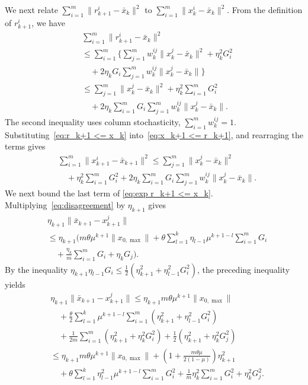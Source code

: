 \documentclass[twocolumn]{autart}    %
\newcommand{\1}{\mathbf{1}}
\begin{document}
We next relate $\sum_{i=1}^m \|r_{k+1}^i - \bar{x}_k\|^2$ to $\sum_{i=1}^m \|x_k^i - \bar{x}_k\|^2$. 
From the definition of $r_{k+1}^i$, we have
\begin{align}\label{eq:r_k+1 <= x_k}
&\sum_{i=1}^m\|r_{k+1}^i - \bar{x}_k\|^2\nonumber \\ 
&\leq \sum_{i=1}^m\Big\{ \sum_{j=1}^m w_k^{ij} \|x_k^j - \bar{x}_k\|^2 + \eta_k^2 G_i^2  \nonumber \\ 
&\hspace{1em}+ 2\eta_k G_i \sum_{j=1}^m w_k^{ij} \|x_k^j - \bar{x}_k\|  \Big\} \nonumber \\ 
&\leq  \sum_{j=1}^m \|x_k^j - \bar{x}_k\|^2  + \eta_k^2 \sum_{i=1}^m G_i^2   \nonumber \\  
&\hspace{1em}+ 2\eta_k \sum_{i=1}^m G_i \sum_{j=1}^m w_k^{ij}  \|x_k^j - \bar{x}_k\|.
\end{align}
The second inequality uses column stochasticity, $\sum_{i=1}^m w_k^{ij}=1$. Substituting~\eqref{eq:r_k+1 <= x_k} into~\eqref{eq:x_k+1 <= r_k+1}, and rearraging the terms gives
\begin{align}\label{eq:exp r_k+1 <= x_k}
&\sum_{i=1}^m \|x_{k+1}^i - \bar{x}_{k+1}\|^2       \leq   \sum_{j=1}^m \|x_k^j - \bar{x}_k\|^2\nonumber\\
&\hspace{1em}+ \eta_k^2 \sum_{i=1}^m  G_i^2  + 2\eta_k \sum_{i=1}^m  G_i \sum_{j=1}^m  w_k^{ij}   \|x_k^j - \bar{x}_k\|.  
\end{align}
We next bound the last term of \eqref{eq:exp r_k+1 <= x_k}.
Multiplying~\eqref{eq:disagreement} by $\eta_{k+1}$ gives
\begin{align*}
& \eta_{k+1}\|\bar{x}_{k+1}-x_{k+1}^j\| \nonumber \\
&\le  \eta_{k+1}\bigg(m\theta\mu^{k+1} \|x_{0,\max}\| + \theta \sum_{l=1}^k \eta_{l-1} \mu^{k+1-l} \sum_{i=1}^m G_i \nonumber \\
& \hspace{1em} + \frac{\eta_k}{m} \sum_{i=1}^m G_i + \eta_k G_j  \bigg).
\end{align*}
By the inequality $\eta_{k+1} \eta_{l-1} G_i \leq \frac{1}{2} \left( \eta_{k+1}^2 + \eta_{l-1}^2 G_i^2 \right)$, the preceding inequality yields 
\begin{align}\label{eq:eta*disagreement}
& \eta_{k+1} \|\bar{x}_{k+1}-x_{k+1}^j\|  \leq  \eta_{k+1} m\theta\mu^{k+1} \|x_{0,\max}\|  \nonumber \\ 
& \quad + \frac{\theta }{2} \sum_{l=1}^k \mu^{k+1-l} \sum_{i=1}^m \left( \eta_{k+1}^2 + \eta_{l-1}^2 G_i^2 \right)\nonumber \\
& \quad+ \frac{1}{2m} \sum_{i=1}^m \left(  \eta_{k+1}^2 + \eta_{k}^2  G_i^2 \right) + \frac{1}{2}( \eta_{k+1}^2 + \eta_k^2  G_j^2) \nonumber \\ 
 & \leq \eta_{k+1} m \theta \mu^{k+1}  \|x_{0,\max}\| + \left(1 + \frac{m\theta\mu}{2(1-\mu)}\right) \eta_{k+1}^2 \nonumber \\
& \quad + \theta \sum_{l=1}^k \eta_
{l-1}^2 \mu^{k+1-l} \sum_{i=1}^m G_i^2   + \frac{1}{m} \eta_k^2 \sum_{i=1}^m G_i^2 + \eta_k^2 G_j^2.
\end{align}
\end{document}

